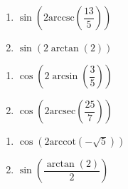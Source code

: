 \begin{multicols}{2}

\begin{enumerate}

\setcounter{enumi}{\value{HW}}

\item  $\sin\left(2\text{arccsc}\left(\dfrac{13}{5}\right)\right)$
\item  $\sin\left(2\arctan\left(2\right)\right)$ 

\setcounter{HW}{\value{enumi}}

\end{enumerate}

\end{multicols}

\begin{multicols}{2}

\begin{enumerate}

\setcounter{enumi}{\value{HW}}

\item  $\cos\left(2 \arcsin\left(\dfrac{3}{5}\right)\right)$
\item  $\cos\left(2 \text{arcsec}\left(\dfrac{25}{7}\right)\right)$

\setcounter{HW}{\value{enumi}}

\end{enumerate}

\end{multicols}

\begin{multicols}{2}

\begin{enumerate}

\setcounter{enumi}{\value{HW}}

\item  $\cos\left(2 \text{arccot}\left(-\sqrt{5}\right)\right)$ 
\item  $\sin\left( \dfrac{\arctan(2)}{2} \right)$ \label{exactvalueidenlast}

\setcounter{HW}{\value{enumi}}

\end{enumerate}

\end{multicols}

\pagebreak

